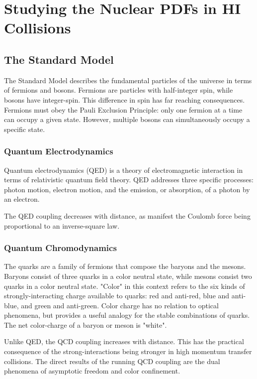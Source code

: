 
\chapter{Studying the Nuclear PDFs in HI Collisions}

\section{The Standard Model}

The Standard Model describes the fundamental particles of the universe in terms of fermions and bosons. Fermions are particles with half-integer spin, while bosons have integer-spin. This difference in spin has far reaching consequences. Fermions must obey the Pauli Exclusion Principle: only one fermion at a time can occupy a given state. However, multiple bosons can simultaneously occupy a specific state. 

\subsection{Quantum Electrodynamics}

Quantum electrodynamics (QED) is a theory of electromagnetic interaction in terms of relativistic quantum field theory. QED addresses three specific processes: photon motion, electron motion, and the emission, or absorption, of a photon by an electron.

The QED coupling decreases with distance, as manifest the Coulomb force being proportional to an inverse-square law. 

\subsection{Quantum Chromodynamics}

The quarks are a family of fermions that compose the baryons and the mesons. Baryons consist of three quarks in a color neutral state, while mesons consist two quarks in a color neutral state. "Color" in this context refers to the six kinds of strongly-interacting charge available to quarks: red and anti-red, blue and anti-blue, and green and anti-green. Color charge has no relation to optical phenomena, but provides a useful analogy for the stable combinations of quarks. The net color-charge of a baryon or meson is "white".

Unlike QED, the QCD coupling increases with distance. This has the practical consequence of the strong-interactions being stronger in high momentum transfer collisions. The direct results of the running QCD coupling are the dual phenomena of asymptotic freedom and color confinement.

